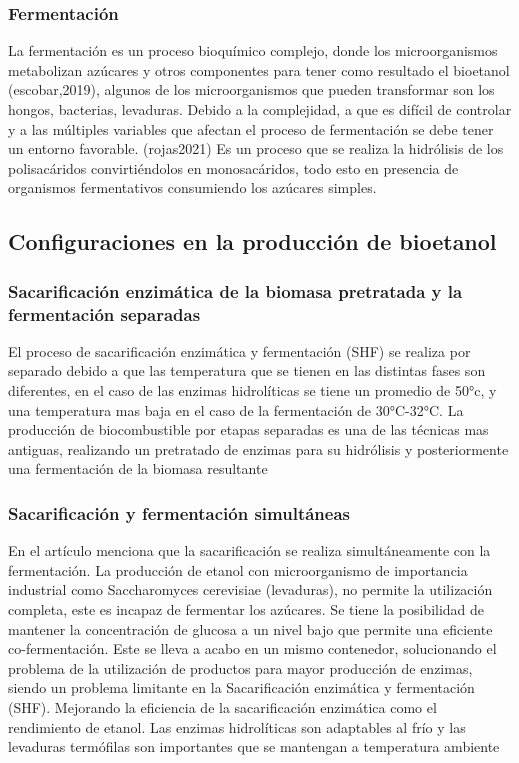 \documentclass[12pt]{article}
\begin{document}
		
		
		\subsubsection{Fermentación}
		La fermentación es un proceso bioquímico complejo, donde los microorganismos metabolizan azúcares y otros componentes para tener como resultado el bioetanol (escobar,2019), algunos de los microorganismos que pueden transformar son los hongos, bacterias, levaduras. Debido a la complejidad, a que es difícil de controlar y a las múltiples variables que afectan el proceso de fermentación se debe tener un entorno favorable. (rojas2021)
		Es un proceso que se realiza la hidrólisis de los polisacáridos convirtiéndolos en monosacáridos, todo esto en presencia de organismos fermentativos consumiendo los azúcares simples.
		
		
		
		
		\subsection{Configuraciones en la producción de bioetanol}	
		\subsubsection{Sacarificación enzimática de la biomasa pretratada y la fermentación separadas}
		
		El proceso de sacarificación enzimática y fermentación (SHF) se realiza por separado debido a que las temperatura que se tienen en las distintas fases son diferentes, en el caso de las enzimas hidrolíticas se tiene un promedio de 50°c, y una temperatura mas baja en el caso de la fermentación de 30°C-32°C. 
		La producción de biocombustible por etapas separadas es una de las técnicas mas antiguas, realizando un pretratado de enzimas para su hidrólisis y posteriormente una fermentación de la biomasa resultante %
		
		
		
		
		\subsubsection{Sacarificación y fermentación simultáneas}
		
		En el artículo %
		menciona que la sacarificación se realiza simultáneamente con la fermentación.
		La producción de etanol con microorganismo de importancia industrial como Saccharomyces cerevisiae (levaduras), no permite la utilización completa, este es incapaz de fermentar los azúcares. Se tiene la posibilidad de mantener la concentración de glucosa a un nivel bajo que permite una eficiente co-fermentación.
		Este se lleva a acabo en un mismo contenedor, solucionando el problema de la utilización de productos para mayor producción de enzimas, siendo un problema limitante en la Sacarificación enzimática y fermentación (SHF). Mejorando la eficiencia de la sacarificación enzimática como el rendimiento de etanol. 
		Las enzimas hidrolíticas son adaptables al frío y las levaduras termófilas son importantes que se mantengan a temperatura ambiente %
		
\end{document}
